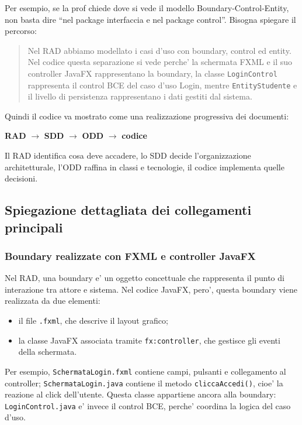 ﻿\documentclass[11pt,a4paper]{article}
\begin{document}
Per esempio, se la prof chiede dove si vede il modello Boundary-Control-Entity, non basta
dire ``nel package interfaccia e nel package control''. Bisogna spiegare il percorso:
\begin{quote}
Nel RAD abbiamo modellato i casi d'uso con boundary, control ed entity. Nel codice questa
separazione si vede perche' la schermata FXML e il suo controller JavaFX rappresentano la
boundary, la classe \texttt{LoginControl} rappresenta il control BCE del caso d'uso Login,
mentre \texttt{EntityStudente} e il livello di persistenza rappresentano i dati gestiti dal
sistema.
\end{quote}

Quindi il codice va mostrato come una realizzazione progressiva dei documenti:
\begin{center}
\textbf{RAD} \(\rightarrow\) \textbf{SDD} \(\rightarrow\) \textbf{ODD}
\(\rightarrow\) \textbf{codice}
\end{center}
Il RAD identifica cosa deve accadere, lo SDD decide l'organizzazione architetturale,
l'ODD raffina in classi e tecnologie, il codice implementa quelle decisioni.

\subsection{Spiegazione dettagliata dei collegamenti principali}

\subsubsection{Boundary realizzate con FXML e controller JavaFX}

Nel RAD, una boundary e' un oggetto concettuale che rappresenta il punto di interazione
tra attore e sistema. Nel codice JavaFX, pero', questa boundary viene realizzata da due
elementi:
\begin{itemize}
  \item il file \texttt{.fxml}, che descrive il layout grafico;
  \item la classe JavaFX associata tramite \texttt{fx:controller}, che gestisce gli eventi
  della schermata.
\end{itemize}

Per esempio, \texttt{SchermataLogin.fxml} contiene campi, pulsanti e collegamento al
controller; \texttt{SchermataLogin.java} contiene il metodo \texttt{cliccaAccedi()}, cioe'
la reazione al click dell'utente. Questa classe appartiene ancora alla boundary:
\texttt{LoginControl.java} e' invece il control BCE, perche' coordina la logica del caso
d'uso.
\end{document}
